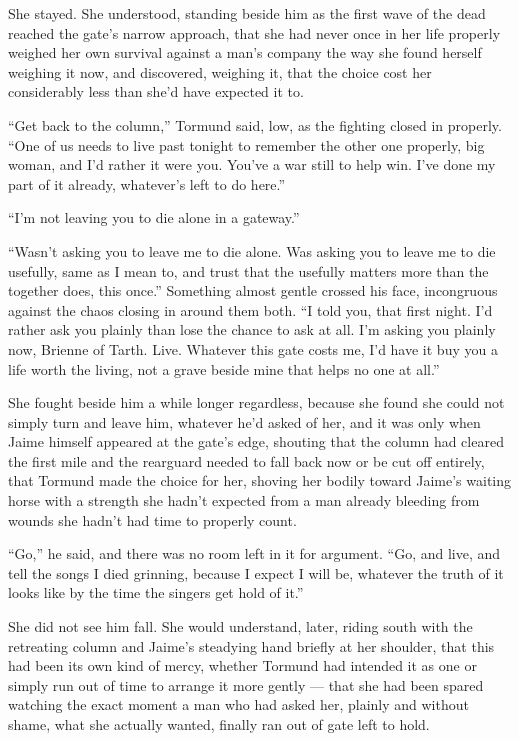 \sceneBreak

She stayed. She understood, standing beside him as the first wave of the dead reached the gate’s narrow approach, that she had never once in her life properly weighed her own survival against a man’s company the way she found herself weighing it now, and discovered, weighing it, that the choice cost her considerably less than she’d have expected it to.

“Get back to the column,” Tormund said, low, as the fighting closed in properly. “One of us needs to live past tonight to remember the other one properly, big woman, and I’d rather it were you. You’ve a war still to help win. I’ve done my part of it already, whatever’s left to do here.”

“I’m not leaving you to die alone in a gateway.”

“Wasn’t asking you to leave me to die alone. Was asking you to leave me to die usefully, same as I mean to, and trust that the usefully matters more than the together does, this once.” Something almost gentle crossed his face, incongruous against the chaos closing in around them both. “I told you, that first night. I’d rather ask you plainly than lose the chance to ask at all. I’m asking you plainly now, Brienne of Tarth. Live. Whatever this gate costs me, I’d have it buy you a life worth the living, not a grave beside mine that helps no one at all.”

She fought beside him a while longer regardless, because she found she could not simply turn and leave him, whatever he’d asked of her, and it was only when Jaime himself appeared at the gate’s edge, shouting that the column had cleared the first mile and the rearguard needed to fall back now or be cut off entirely, that Tormund made the choice for her, shoving her bodily toward Jaime’s waiting horse with a strength she hadn’t expected from a man already bleeding from wounds she hadn’t had time to properly count.

“Go,” he said, and there was no room left in it for argument. “Go, and live, and tell the songs I died grinning, because I expect I will be, whatever the truth of it looks like by the time the singers get hold of it.”

\sceneBreak

She did not see him fall. She would understand, later, riding south with the retreating column and Jaime’s steadying hand briefly at her shoulder, that this had been its own kind of mercy, whether Tormund had intended it as one or simply run out of time to arrange it more gently — that she had been spared watching the exact moment a man who had asked her, plainly and without shame, what she actually wanted, finally ran out of gate left to hold.

